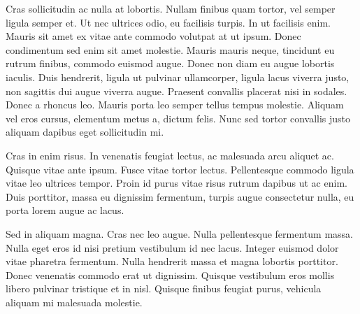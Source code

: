 Cras sollicitudin ac nulla at lobortis. Nullam finibus quam tortor, vel semper
ligula semper et. Ut nec ultrices odio, eu facilisis turpis. In ut facilisis
enim. Mauris sit amet ex vitae ante commodo volutpat at ut ipsum. Donec
condimentum sed enim sit amet molestie. Mauris mauris neque, tincidunt eu rutrum
finibus, commodo euismod augue. Donec non diam eu augue lobortis iaculis. Duis
hendrerit, ligula ut pulvinar ullamcorper, ligula lacus viverra justo, non
sagittis dui augue viverra augue. Praesent convallis placerat nisi in
sodales. Donec a rhoncus leo. Mauris porta leo semper tellus tempus
molestie. Aliquam vel eros cursus, elementum metus a, dictum felis. Nunc sed
tortor convallis justo aliquam dapibus eget sollicitudin mi.

Cras in enim risus. In venenatis feugiat lectus, ac malesuada arcu aliquet
ac. Quisque vitae ante ipsum. Fusce vitae tortor lectus. Pellentesque commodo
ligula vitae leo ultrices tempor. Proin id purus vitae risus rutrum dapibus ut
ac enim. Duis porttitor, massa eu dignissim fermentum, turpis augue consectetur
nulla, eu porta lorem augue ac lacus.

Sed in aliquam magna. Cras nec leo augue. Nulla pellentesque fermentum
massa. Nulla eget eros id nisi pretium vestibulum id nec lacus. Integer euismod
dolor vitae pharetra fermentum. Nulla hendrerit massa et magna lobortis
porttitor. Donec venenatis commodo erat ut dignissim. Quisque vestibulum eros
mollis libero pulvinar tristique et in nisl. Quisque finibus feugiat purus,
vehicula aliquam mi malesuada molestie.





